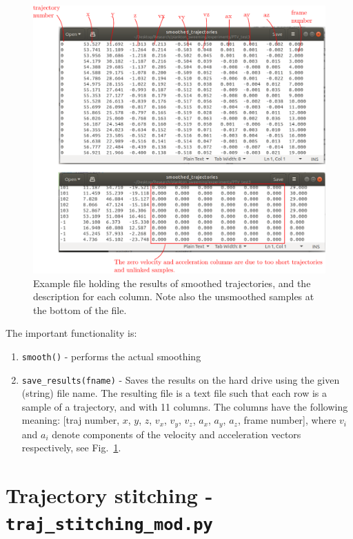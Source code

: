 \documentclass[10pt,a4paper]{article}
\begin{document}
\begin{figure}[!ht]
	\centering
	\includegraphics[width=12cm]{smoothed_trajfile.pdf}
	\caption{Example file holding the results of smoothed trajectories, and the description for each column. Note also the unsmoothed samples at the bottom of the file. \label{fig:smoothedfile}}
\end{figure}

The important functionality is:

\begin{enumerate}
	\item \texttt{smooth()} - performs the actual smoothing
	\item \texttt{save\_results(fname)} - Saves the results on the hard drive using the given (string) file name. The resulting file is a text file such that each row is a sample of a trajectory, and with 11 columns. The columns have the following meaning:
	[traj number, $x$, $y$, $z$, $v_x$, $v_y$, $v_z$, $a_x$, $a_y$, $a_z$, frame number], where $v_i$ and $a_i$ denote components of the velocity and acceleration vectors respectively, see Fig.~\ref{fig:smoothedfile}.
\end{enumerate}







\section{Trajectory stitching - \texttt{traj\_stitching\_mod.py}}\label{sec:stitching}
\end{document}
